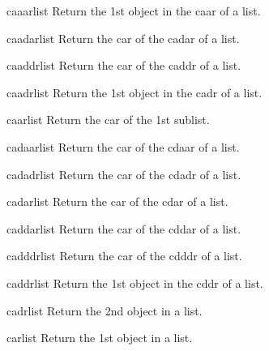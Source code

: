 \begin{accessor}{caaar}{list}{}
  Return the 1st object in the caar of a list.
\end{accessor}

\begin{accessor}{caadar}{list}{}
  Return the car of the cadar of a list.
\end{accessor}

\begin{accessor}{caaddr}{list}{}
  Return the car of the caddr of a list.
\end{accessor}

\begin{accessor}{caadr}{list}{}
  Return the 1st object in the cadr of a list.
\end{accessor}

\begin{accessor}{caar}{list}{}
  Return the car of the 1st sublist.
\end{accessor}

\begin{accessor}{cadaar}{list}{}
  Return the car of the cdaar of a list.
\end{accessor}

\begin{accessor}{cadadr}{list}{}
  Return the car of the cdadr of a list.
\end{accessor}

\begin{accessor}{cadar}{list}{}
  Return the car of the cdar of a list.
\end{accessor}

\begin{accessor}{caddar}{list}{}
  Return the car of the cddar of a list.
\end{accessor}

\begin{accessor}{cadddr}{list}{}
  Return the car of the cdddr of a list.
\end{accessor}

\begin{accessor}{caddr}{list}{}
  Return the 1st object in the cddr of a list.
\end{accessor}

\begin{accessor}{cadr}{list}{}
  Return the 2nd object in a list.
\end{accessor}

\begin{accessor}{car}{list}{}
  Return the 1st object in a list.
\end{accessor}

